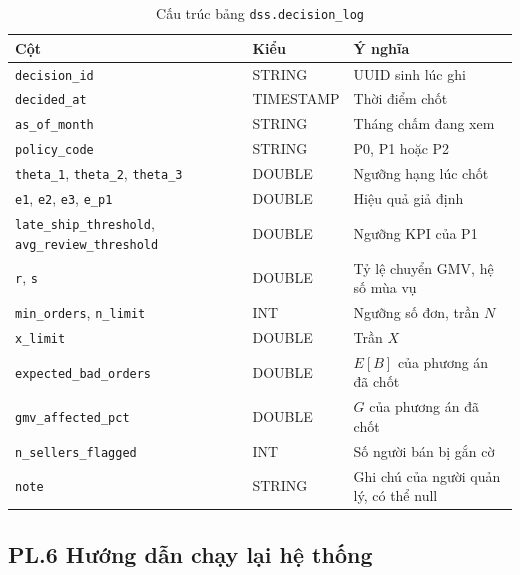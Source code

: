 \documentclass[a4paper]{article}
\begin{document}
\begin{table}[htbp]
\centering
\footnotesize
\setlength{\tabcolsep}{3pt}
\renewcommand{\arraystretch}{1.1}
\caption{Cấu trúc bảng \texttt{dss.decision\_\allowbreak{}log}}
\label{tab:pl_decision_log}
\begin{tabularx}{\textwidth}{@{}>{\raggedright\arraybackslash}p{5.4cm}>{\raggedright\arraybackslash}p{2.2cm}>{\raggedright\arraybackslash}X@{}}
\toprule
\textbf{Cột} & \textbf{Kiểu} & \textbf{Ý nghĩa} \\
\midrule
\texttt{decision\_\allowbreak{}id} & STRING & UUID sinh lúc ghi \\
\texttt{decided\_\allowbreak{}at} & TIMESTAMP & Thời điểm chốt \\
\texttt{as\_\allowbreak{}of\_\allowbreak{}month} & STRING & Tháng chấm đang xem \\
\texttt{policy\_\allowbreak{}code} & STRING & P0, P1 hoặc P2 \\
\texttt{theta\_\allowbreak{}1}, \texttt{theta\_\allowbreak{}2}, \texttt{theta\_\allowbreak{}3} & DOUBLE & Ngưỡng hạng lúc chốt \\
\texttt{e1}, \texttt{e2}, \texttt{e3}, \texttt{e\_\allowbreak{}p1} & DOUBLE & Hiệu quả giả định \\
\texttt{late\_\allowbreak{}ship\_\allowbreak{}threshold}, \texttt{avg\_\allowbreak{}review\_\allowbreak{}threshold} & DOUBLE & Ngưỡng KPI của P1 \\
\texttt{r}, \texttt{s} & DOUBLE & Tỷ lệ chuyển GMV, hệ số mùa vụ \\
\texttt{min\_\allowbreak{}orders}, \texttt{n\_\allowbreak{}limit} & INT & Ngưỡng số đơn, trần $N$ \\
\texttt{x\_\allowbreak{}limit} & DOUBLE & Trần $X$ \\
\texttt{expected\_\allowbreak{}bad\_\allowbreak{}orders} & DOUBLE & $E[B]$ của phương án đã chốt \\
\texttt{gmv\_\allowbreak{}affected\_\allowbreak{}pct} & DOUBLE & $G$ của phương án đã chốt \\
\texttt{n\_\allowbreak{}sellers\_\allowbreak{}flagged} & INT & Số người bán bị gắn cờ \\
\texttt{note} & STRING & Ghi chú của người quản lý, có thể null \\
\bottomrule
\end{tabularx}
\end{table}

\label{pl:6}
\subsection*{PL.6 Hướng dẫn chạy lại hệ thống}
\end{document}
